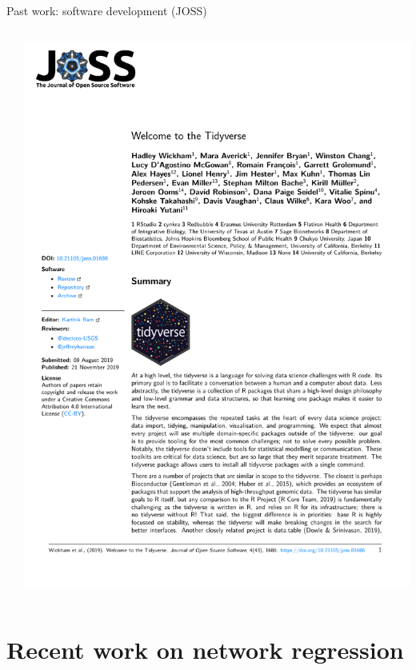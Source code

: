 \documentclass[aspectratio=169]{beamer}
\theoremstyle{remark}
\begin{document}
\begin{frame}{Past work: software development (JOSS)}
\begin{columns}
\begin{column}{0.5\textwidth}
        \end{column}
        \begin{column}{0.5\textwidth}
            \centering
            \includegraphics[height=0.95\textheight, page=1, trim={5.5cm 9.4cm 0 3.5cm}, clip]{./papers/tidyverse.pdf}
        \end{column}
    \end{columns}
\end{frame}

\section{Recent work on network regression}
\end{document}
